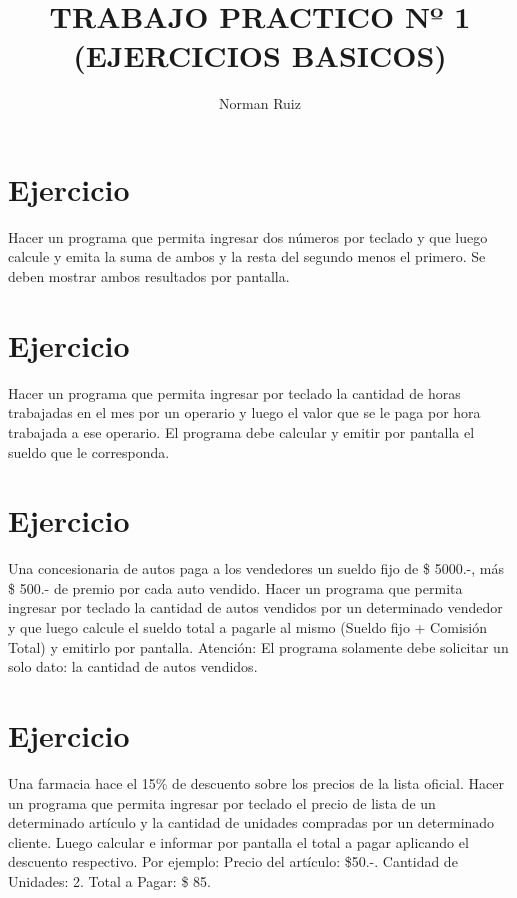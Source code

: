 \documentclass[12pt,a4paper,twoside]{article}
\author{Norman Ruiz}
\title{TRABAJO PRACTICO \linebreak Nº 1 \linebreak (EJERCICIOS BASICOS)}
\begin{document}
\maketitle
\newpage

\tableofcontents
\newpage

\section{Ejercicio }

\hspace*{1cm}Hacer un programa que permita ingresar dos números por teclado y que luego calcule y emita la suma de ambos y la resta del segundo menos el primero. Se deben mostrar ambos resultados por pantalla.

\newpage
\section{Ejercicio }

\hspace*{1cm}Hacer un programa que permita ingresar por teclado la cantidad de horas trabajadas en el mes por un operario y luego el valor que se le paga por hora trabajada a ese operario. El programa debe calcular y emitir por pantalla el sueldo que le corresponda.

\newpage
\section{Ejercicio }

\hspace*{1cm}Una concesionaria de autos paga a los vendedores un sueldo fijo de \$ 5000.-, más \$ 500.- de premio por cada auto vendido. Hacer un programa que permita ingresar por teclado la cantidad de autos vendidos por un determinado vendedor y que luego calcule el sueldo total a pagarle al mismo (Sueldo fijo + Comisión Total) y emitirlo por pantalla.
Atención: El programa solamente debe solicitar un solo dato: la cantidad de autos vendidos.

\newpage
\section{Ejercicio }

\hspace*{1cm}Una farmacia hace el 15\% de descuento sobre los precios de la lista oficial. Hacer un programa que permita ingresar por teclado el precio de lista de un determinado artículo y la cantidad de unidades compradas por un determinado cliente. Luego calcular e informar por pantalla el total a pagar aplicando el descuento respectivo. 
Por ejemplo: Precio del artículo: \$50.-. Cantidad de Unidades: 2. Total a Pagar: \$ 85.
\end{document}

